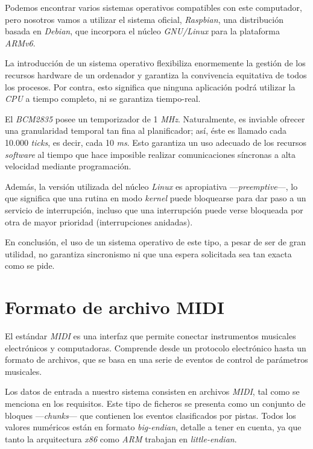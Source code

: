 Podemos encontrar varios sistemas operativos compatibles con este computador, pero nosotros vamos a utilizar el sistema oficial, \textit{Raspbian}, una distribución basada en \textit{Debian}, que incorpora el núcleo \textit{GNU/Linux} para la plataforma \textit{ARMv6}.

La introducción de un sistema operativo flexibiliza enormemente la gestión de los recursos hardware de un ordenador y garantiza la convivencia equitativa de todos los procesos. Por contra, esto significa que ninguna aplicación podrá utilizar la \textit{CPU} a tiempo completo, ni se garantiza tiempo-real.

El \textit{BCM2835} posee un temporizador de 1 \textit{MHz}. Naturalmente, es inviable ofrecer una granularidad temporal tan fina al planificador; así, éste es llamado cada 10.000 \textit{ticks}, es decir, cada 10 \textit{ms}. Esto garantiza un uso adecuado de los recursos \textit{software} al tiempo que hace imposible realizar comunicaciones síncronas a alta velocidad mediante programación.

Además, la versión utilizada del núcleo \textit{Linux} es apropiativa ---\textit{preemptive}---, lo que significa que una rutina en modo \textit{kernel} puede bloquearse para dar paso a un servicio de interrupción, incluso que una interrupción puede verse bloqueada por otra de mayor prioridad (interrupciones anidadas).

En conclusión, el uso de un sistema operativo de este tipo, a pesar de ser de gran utilidad, no garantiza sincronismo ni que una espera solicitada sea tan exacta como se pide.

\section{Formato de archivo MIDI}

El estándar \textit{MIDI} es una interfaz que permite conectar instrumentos musicales electrónicos y computadoras. Comprende desde un protocolo electrónico hasta un formato de archivos, que se basa en una serie de eventos de control de parámetros musicales.

Los datos de entrada a nuestro sistema consisten en archivos \textit{MIDI}, tal como se menciona en los requisitos. Este tipo de ficheros se presenta como un conjunto de bloques ---\textit{chunks}--- que contienen los eventos clasificados por pistas. Todos los valores numéricos están en formato \textit{big-endian}, detalle a tener en cuenta, ya que tanto la arquitectura \textit{x86} como \textit{ARM} trabajan en \textit{little-endian}.

